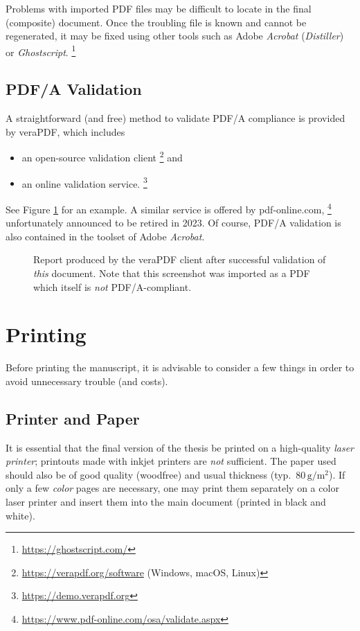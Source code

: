 Problems with imported PDF files may be difficult to locate in the final (composite)
document. Once the troubling file is known and cannot be regenerated, it may be fixed using 
other tools such as Adobe \emph{Acrobat} (\emph{Distiller}) or \emph{Ghostscript}.%
\footnote{\url{https://ghostscript.com/}}


\subsection{PDF/A Validation}
\label{sec:PDFA-validation}

A straightforward (and free) method to validate PDF/A compliance is provided by
\textsf{veraPDF}, which includes
%
\begin{itemize}
\item an open-source validation client%
  \footnote{\url{https://verapdf.org/software} (Windows, macOS, Linux)} and
\item an online validation service.%
  \footnote{\url{https://demo.verapdf.org}}
\end{itemize}
%
See Figure \ref{fig:verapdf-report} for an example.
A similar service is offered by \textsf{pdf-online.com},%
\footnote{\url{https://www.pdf-online.com/osa/validate.aspx}}
unfortunately announced to be retired in 2023.
Of course, PDF/A validation is also contained in the toolset of Adobe \emph{Acrobat}.

\begin{figure}[htbp]
    \centering
    \caption{Report produced by the \textsf{veraPDF} client after successful validation
    of \emph{this} document. Note that this screenshot was imported as a PDF 
    which itself is \emph{not} PDF/A-compliant.}
    \label{fig:verapdf-report}
\end{figure}


\section{Printing}

Before printing the manuscript, it is advisable to consider a few things in
order to avoid unnecessary trouble (and costs).


\subsection{Printer and Paper}

It is essential that the final version of the thesis be printed on a high-quality
\emph{laser printer}; printouts made with inkjet printers are \emph{not} sufficient.
The paper used should also be of good quality (woodfree) and usual thickness 
(typ.\ $80\,\mathrm{g} / \mathrm{m}^2$). If only a few \emph{color} pages are
necessary, one may print them separately on a color laser printer and insert
them into the main document (printed in black and white).

